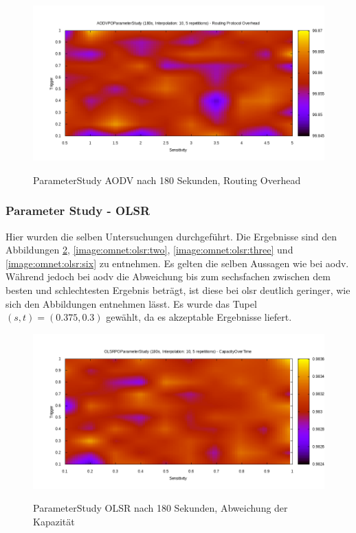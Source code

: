 \begin{figure}
  \centering
  \includegraphics[scale=0.55]{bilder/aps6.png} \\
  \caption{ParameterStudy AODV nach 180 Sekunden, Routing Overhead}
  \label{image:omnet:aodv:six}
\end{figure}

\subsubsection{Parameter Study - OLSR}
\label{chapter:auswertung:studyaodv}

Hier wurden die selben Untersuchungen durchgeführt. Die Ergebnisse sind den Abbildungen \ref{image:omnet:olsr:one}, \ref{image:omnet:olsr:two}, \ref{image:omnet:olsr:three} und \ref{image:omnet:olsr:six} zu entnehmen. Es gelten die selben Aussagen wie bei \gls{aodv}. Während jedoch bei \gls{aodv} die Abweichung bis zum sechsfachen zwischen dem besten und schlechtesten Ergebnis beträgt, ist diese bei \gls{olsr} deutlich geringer, wie sich den Abbildungen entnehmen lässt. Es wurde das Tupel $(s,t) = (0{.}375 ,0{.}3)$ gewählt, da es akzeptable Ergebnisse liefert.

\begin{figure}
  \centering
  \includegraphics[scale=0.55]{bilder/ops1.png} \\
  \caption{ParameterStudy OLSR nach 180 Sekunden, Abweichung der Kapazität}
  \label{image:omnet:olsr:one}
\end{figure}


